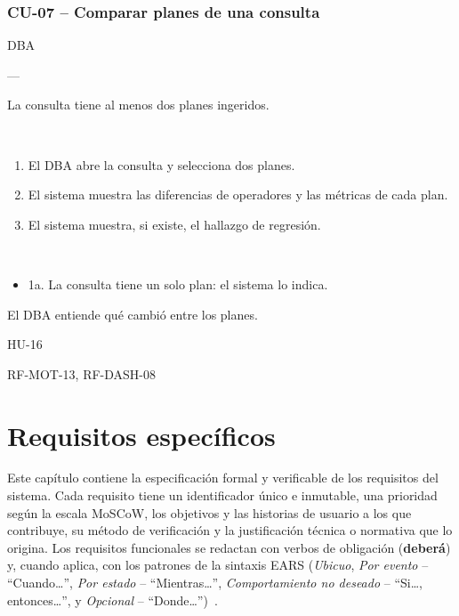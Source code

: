 \documentclass[11pt,a4paper]{report}
\begin{document}
\subsection{CU-07 -- Comparar planes de una consulta}
\begin{description}[leftmargin=3.3cm,style=nextline]
\item[Actor principal] DBA
\item[Actor secundario] ---
\item[Precondiciones] La consulta tiene al menos dos planes ingeridos.
\item[Flujo principal]~
\begin{enumerate}[leftmargin=1.3em,itemsep=1pt]
\item El DBA abre la consulta y selecciona dos planes.
\item El sistema muestra las diferencias de operadores y las métricas de cada plan.
\item El sistema muestra, si existe, el hallazgo de regresión.
\end{enumerate}
\item[Flujos alternos]~
\begin{itemize}[leftmargin=1.3em,itemsep=1pt]
\item 1a. La consulta tiene un solo plan: el sistema lo indica.
\end{itemize}
\item[Postcondici\'on] El DBA entiende qué cambió entre los planes.
\item[Historias relacionadas] HU-16
\item[Requisitos relacionados] RF-MOT-13, RF-DASH-08
\end{description}

\chapter{Requisitos espec\'ificos}
\label{ch:requisitos}

Este cap\'itulo contiene la especificaci\'on formal y verificable de los requisitos del sistema. Cada requisito tiene un identificador \'unico e inmutable, una prioridad seg\'un la escala MoSCoW, los objetivos y las historias de usuario a los que contribuye, su m\'etodo de verificaci\'on y la justificaci\'on t\'ecnica o normativa que lo origina. Los requisitos funcionales se redactan con verbos de obligaci\'on (\textbf{deber\'a}) y, cuando aplica, con los patrones de la sintaxis EARS (\textit{Ubicuo}, \textit{Por evento} -- \textquotedblleft Cuando\ldots{}\textquotedblright, \textit{Por estado} -- \textquotedblleft Mientras\ldots{}\textquotedblright, \textit{Comportamiento no deseado} -- \textquotedblleft Si\ldots{}, entonces\ldots{}\textquotedblright, y \textit{Opcional} -- \textquotedblleft Donde\ldots{}\textquotedblright)~\cite{R23}.
\end{document}
